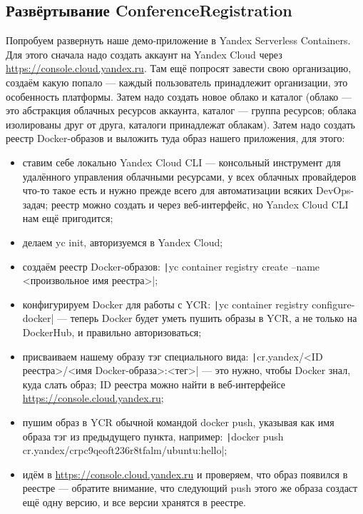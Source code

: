\documentclass{../../text-style}
\begin{document}
\subsection{Развёртывание ConferenceRegistration}

Попробуем развернуть наше демо-приложение в Yandex Serverless Containers. Для этого сначала надо создать аккаунт на Yandex Cloud через \url{https://console.cloud.yandex.ru}. Там ещё попросят завести свою организацию, создаём какую попало --- каждый пользователь принадлежит организации, это особенность платформы. Затем надо создать новое облако и каталог (облако --- это абстракция облачных ресурсов аккаунта, каталог --- группа ресурсов; облака изолированы друг от друга, каталоги принадлежат облакам). Затем надо создать реестр Docker-образов и выложить туда образ нашего приложения, для этого:

\begin{itemize}
    \item ставим себе локально Yandex Cloud CLI --- консольный инструмент для удалённого управления облачными ресурсами, у всех облачных провайдеров что-то такое есть и нужно прежде всего для автоматизации всяких DevOps-задач; реестр можно создать и через веб-интерфейс, но Yandex Cloud CLI нам ещё пригодится;
    \item делаем yc init, авторизуемся в Yandex Cloud;
    \item создаём реестр Docker-образов: \texttt|yc container registry create --name <произвольное имя реестра>|;
    \item конфигурируем Docker для работы с YCR: \texttt|yc container registry configure-docker| --- теперь Docker будет уметь пушить образы в YCR, а не только на DockerHub, и правильно авторизоваться;
    \item присваиваем нашему образу тэг специального вида: \texttt|cr.yandex/<ID реестра>/<имя Docker-образа>:<тег>| --- это нужно, чтобы Docker знал, куда слать образ; ID реестра можно найти в веб-интерфейсе \url{https://console.cloud.yandex.ru};
    \item пушим образ в YCR обычной командой docker push, указывая как имя образа тэг из предыдущего пункта, например: \texttt|docker push cr.yandex/crpc9qeoft236r8tfalm/ubuntu:hello|;
    \item идём в \url{https://console.cloud.yandex.ru} и проверяем, что образ появился в реестре --- обратите внимание, что следующий push этого же образа создаст ещё одну версию, и все версии хранятся в реестре.
\end{itemize}
\end{document}
